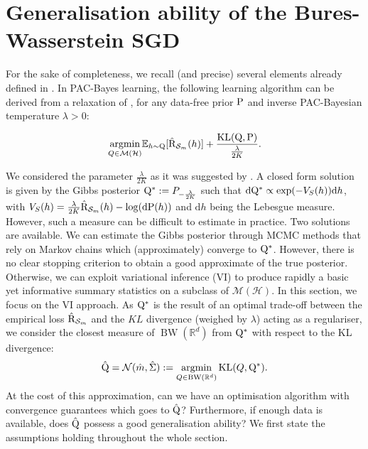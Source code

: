 \section{Generalisation ability of the Bures-Wasserstein SGD}

\label{sec: gene_sgd}

For the sake of completeness, we recall (and precise) several elements already defined in .
In PAC-Bayes learning, the following learning algorithm can be derived from a relaxation of \citet[][Theorem 1.2.6]{catoni2007pac}, for any data-free prior $\P$ and inverse PAC-Bayesian temperature $\lambda>0$:

\[ \underset{Q\in \mathcal{M}(\mathcal{H})}{\operatorname{argmin}} \mathbb{E}_{h\sim \Q}[\Riskhat_{\Sm}(h)] + \frac{\operatorname{KL}(\Q,\P)}{\frac{\lambda}{2K}}.  \]

\noindent We considered the parameter $\frac{\lambda}{2K}$ as it was suggested by .
A closed form solution is given by the Gibbs posterior $\Q^*:= P_{-\frac{\lambda}{2K}}$ such that $\mathrm{d}\Q^* \propto \exp(-V_S(h))\mathrm{d}h$, with $V_S(h) = \frac{\lambda}{2K}\Riskhat_{\Sm}(h) - \log(\mathrm{d}\P(h))$ and $\mathrm{d}h$ being the Lebesgue measure.
However, such a measure can be difficult to estimate in practice. Two solutions are available. We can estimate the Gibbs posterior through MCMC methods that rely on Markov chains which (approximately) converge to $\Q^*$. However, there is no clear stopping criterion to obtain a good approximate of the true posterior. Otherwise, we can exploit variational inference (VI) to produce rapidly a basic yet informative summary statistics on a subclass of $\mathcal{M}(\mathcal{H})$.
In this section, we focus on the VI approach. As $\Q^*$ is the result of an optimal trade-off between the empirical loss $\Riskhat_{\Sm}$ and the $KL$ divergence (weighed by $\lambda$) acting as a regulariser, we consider the closest measure of $\operatorname{BW}(\mathbb{R}^d)$ from $\Q^*$ with respect to the KL divergence:
\[ \hat{\Q} = \mathcal{N}(\hat{m},\hat{\Sigma}) := \underset{Q\in \operatorname{BW}(\mathbb{R}^d)}{\operatorname{argmin}} \operatorname{KL}(Q,\Q^*). \]
At the cost of this approximation, can we have an optimisation algorithm with convergence guarantees which goes to $\hat{\Q}$? Furthermore, if enough data is available, does $\hat{\Q}$ possess a good generalisation ability?
We first state the assumptions holding throughout the whole section.

